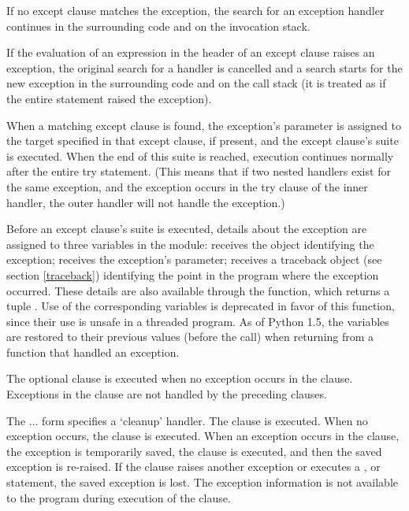 If no except clause matches the exception, the search for an exception
handler continues in the surrounding code and on the invocation stack.

If the evaluation of an expression in the header of an except clause
raises an exception, the original search for a handler is cancelled
and a search starts for the new exception in the surrounding code and
on the call stack (it is treated as if the entire  statement
raised the exception).

When a matching except clause is found, the exception's parameter is
assigned to the target specified in that except clause, if present,
and the except clause's suite is executed.  When the end of this suite
is reached, execution continues normally after the entire try
statement.  (This means that if two nested handlers exist for the same
exception, and the exception occurs in the try clause of the inner
handler, the outer handler will not handle the exception.)

Before an except clause's suite is executed, details about the
exception are assigned to three variables in the
 module:  receives
the object identifying the exception;  receives
the exception's parameter;  receives a
traceback object (see section \ref{traceback})
identifying the point in the program where the exception occurred.
These details are also available through the 
function, which returns a tuple .  Use of the corresponding variables is
deprecated in favor of this function, since their use is unsafe in a
threaded program.  As of Python 1.5, the variables are restored to
their previous values (before the call) when returning from a function
that handled an exception.

The optional  clause is executed when no exception occurs
in the  clause.  Exceptions in the  clause are
not handled by the preceding  clauses.

The ... form specifies a `cleanup' handler.  The
 clause is executed.  When no exception occurs, the
 clause is executed.  When an exception occurs in the
 clause, the exception is temporarily saved, the
 clause is executed, and then the saved exception is
re-raised.  If the  clause raises another exception or
executes a ,  or  statement,
the saved exception is lost.  The exception information is not
available to the program during execution of the 
clause.

